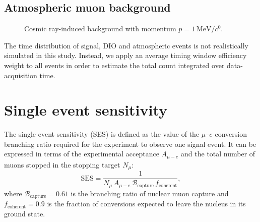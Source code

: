 \subsection{Atmospheric muon background}
\begin{figure}
    \centering
    
    \caption{Cosmic ray-induced background with momentum $p=\SI{1}{\MeV/\clight}$.}
    \label{fig:cosmic_bg_in_cydet}
\end{figure}

The time distribution of signal, DIO and atmospheric events is not realistically
simulated in this study. Instead, we apply an average timing window efficiency
weight to all events in order to estimate the total count integrated over
data-acquisition time.

\section{Single event sensitivity}
The single event sensitivity (SES) is defined as the value of the $\mu$--$e$
conversion branching ratio required for the experiment to observe one signal
event. It can be expressed in terms of the experimental acceptance $A_{\mu-e}$ and the
total number of muons stopped in the stopping target $N_\mu$:
\begin{equation}
    \mathrm{SES} = \frac{1}{N_\mu\,A_{\mu-e}\,\mathcal{B}_\mathrm{capture}\,f_\mathrm{coherent}},
\end{equation}
where $\mathcal{B}_\mathrm{capture} = 0.61$ is the branching ratio of nuclear
muon capture and $f_\mathrm{coherent} = 0.9$ is the fraction of conversions
expected to leave the nucleus in its ground state.



